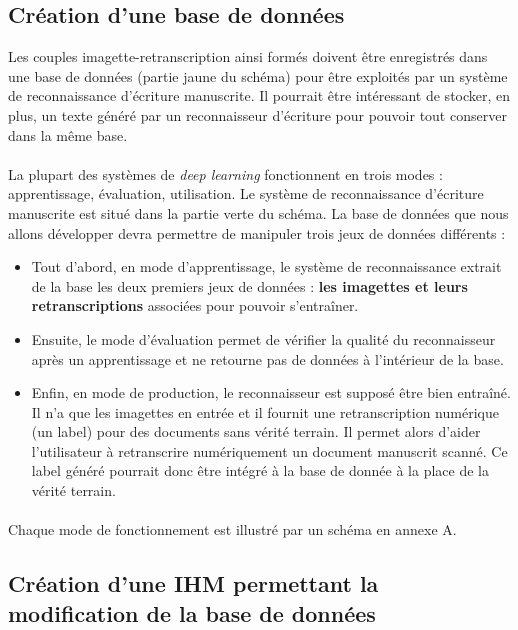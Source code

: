\subsection{Création d'une base de données}

Les couples imagette-retranscription ainsi formés doivent être enregistrés dans une base de données
(partie jaune du schéma) pour être exploités par un système de reconnaissance d’écriture manuscrite.
Il pourrait être intéressant de stocker, en plus, un texte généré par un reconnaisseur d’écriture pour
pouvoir tout conserver dans la même base.

\paragraph{}
La plupart des systèmes de \textit{deep learning} fonctionnent en trois modes : apprentissage, évaluation,
utilisation. Le système de reconnaissance d’écriture manuscrite est situé dans la partie verte du schéma.
La base de données que nous allons développer devra permettre de manipuler trois jeux de données différents : 

\begin{itemize}
\item Tout d’abord, en mode d’apprentissage, le système de reconnaissance extrait de la base les deux premiers
jeux de données : \textbf{les imagettes et leurs retranscriptions} associées pour pouvoir s'entraîner.
\item Ensuite, le mode d'évaluation permet de vérifier la qualité du reconnaisseur après un apprentissage
et ne retourne pas de données à l’intérieur de la base.
\item Enfin, en mode de production, le reconnaisseur est supposé être bien entraîné. Il n’a que les imagettes
en entrée et il fournit une retranscription numérique (un label) pour des documents sans vérité terrain.
Il permet alors d’aider l’utilisateur à retranscrire numériquement un document manuscrit scanné.
Ce label généré pourrait donc être intégré à la base de donnée à la place de la vérité terrain. 
\end{itemize}

\paragraph{}
Chaque mode de fonctionnement est illustré par un schéma en annexe A.

\subsection{Création d'une IHM permettant la modification de la base de données}

